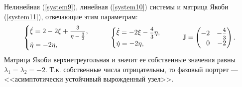 \documentclass[12pt, a4paper]{article}
\begin{document}
\begin{enumerate}
Нелинейная (\ref{system9}), линейная (\ref{system10}) системы и матрица Якоби (\ref{system11}), отвечающие этим параметрам:
\begin{gather*}
	\begin{cases}
		\dot \xi=2-2\xi+\hbox{\footnotesize$\displaystyle\frac{3}{\eta-\frac{3}{2}}$},\\
		\dot \eta=-2\eta,
	\end{cases}
	\qquad
	\begin{cases}
		\dot\xi=-2\xi-\hbox{\footnotesize$\displaystyle\frac{4}{3}$}\eta,\\
		\dot \eta=-2\eta,
	\end{cases}
	\qquad
	\mathbb{J}=\begin{pmatrix}
		-2 & -\hbox{\footnotesize$\displaystyle\frac{4}{3}$} \\
		\phantom{-}0 & -2
	\end{pmatrix}.
\end{gather*}
Матрица Якоби верхнетреугольная и значит ее собственные значения равны $\lambda_1=\lambda_2=-2$.
Т.к. собственные числа отрицательны, то фазовый портрет --- <<асимптотически устойчивый вырожденный узел>>.


\end{enumerate}
\end{document}
